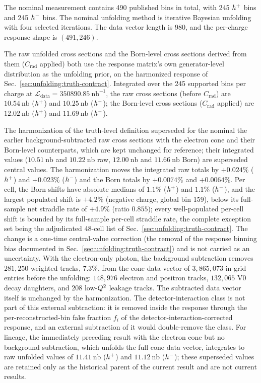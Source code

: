 The nominal measurement contains 490 published bins in total,
with 245 $h^{+}$ bins and 245 $h^{-}$ bins.  The nominal unfolding method is
iterative Bayesian unfolding with four selected iterations.  The data vector
length is 980, and the per-charge response shape is $(491,246)$.

The raw unfolded cross sections and the Born-level cross sections derived from
them ($C_{\mathrm{rad}}$ applied) both use the response matrix's own generator-level
distribution as the unfolding prior, on the harmonized response of
Sec.~\ref{sec:unfolding:truth-contract}.  Integrated over the 245 supported bins
per charge at $\mathcal{L}_{\mathrm{data}}=350890.85~\mathrm{nb}^{-1}$, the raw
cross sections (before $C_{\mathrm{rad}}$) are $10.54~\mathrm{nb}$ ($h^{+}$) and
$10.25~\mathrm{nb}$ ($h^{-}$); the Born-level cross sections
($C_{\mathrm{rad}}$ applied) are
$12.02~\mathrm{nb}$ ($h^{+}$) and $11.69~\mathrm{nb}$
($h^{-}$).

The harmonization of the truth-level definition superseded for the nominal the
earlier background-subtracted raw cross sections with the electron cone and
their Born-level counterparts, which are kept unchanged for reference; their
integrated values
($10.51~\mathrm{nb}$ and $10.22~\mathrm{nb}$ raw,
$12.00~\mathrm{nb}$ and $11.66~\mathrm{nb}$ Born) are superseded
central values.  The harmonization moves the integrated raw totals by $+0.024\%$
($h^{+}$) and $+0.023\%$ ($h^{-}$) and the Born totals by $+0.0074\%$ and
$+0.0064\%$.  Per cell, the Born shifts have absolute medians of $1.1\%$
($h^{+}$) and $1.1\%$ ($h^{-}$), and the largest populated shift is
$+4.2\%$ (negative charge, global bin 159), below its full-sample net
straddle rate of $+4.9\%$ (ratio $0.855$); every well-populated per-cell
shift is bounded by its full-sample per-cell straddle rate, the complete
exception set being the adjudicated 48-cell list of
Sec.~\ref{sec:unfolding:truth-contract}.  The change is a
one-time central-value correction (the removal of the response binning bias
documented in Sec.~\ref{sec:unfolding:truth-contract}) and is not carried
as an uncertainty.  With the electron-only photon, the background
subtraction removes $281{,}250$ weighted tracks, $7.3\%$, from the cone data
vector of $3{,}865{,}073$ in-grid entries before the unfolding:
$148{,}976$ electron and positron tracks, $132{,}065$ V0 decay daughters,
and $208$ low-$Q^{2}$ leakage tracks.  The subtracted data vector itself is
unchanged by the harmonization.  The detector-interaction class is not
part of this external subtraction: it is removed inside the response through
the per-reconstructed-bin fake fraction $f_i$ of the detector-interaction-corrected
response, and an external subtraction of it would double-remove the class.
For lineage, the immediately preceding result with the electron cone but no
background subtraction, which unfolds the full cone data vector, integrates to
raw unfolded
values of $11.41~\mathrm{nb}$ ($h^{+}$) and $11.12~\mathrm{nb}$
($h^{-}$); these superseded values are retained only as the historical
parent of the current result and are not current results.

